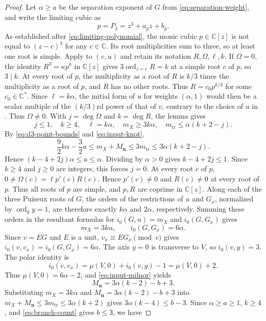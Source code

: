 \documentclass[11pt,letterpaper]{article}
\numberwithin{equation}{section}
\theoremstyle{remark}
\theoremstyle{plain}
\newcommand{\C}{\mathbb{C}}
\newcommand{\ord}{\operatorname{ord}}
\begin{document}
\begin{proof}
Let $\alpha\geq a$ be the separation exponent of $G$ from
\eqref{eq:separation-weight}, and write the limiting cubic as
\[
 p=P_3=z^3+a_pz+b_p.
\]
As established after \eqref{eq:limiting-polynomial}, the monic cubic
$p\in\C[z]$ is not equal to $(z-c)^3$ for any
$c\in\C$.  Its root multiplicities sum to three, so at least one
root is simple.
Apply  to $(v,u)$ and retain its notation
$R,\Omega,\ell,k$.
If $\Omega=0$, the identity $R^3=\kappa p^k$ in $\C[z]$
gives $3\ord_{z=c}R=k$ at a simple root $c$ of $p$, so $3\mid k$.
At every root of $p$, the multiplicity as a root of $R$ is
$k/3$ times the multiplicity as a root of $p$, and $R$ has no other roots.
Thus $R=c_0p^{k/3}$ for some $c_0\in\C^*$.
Since $\ell=k\alpha$, the initial form of $u$ for weights $(\alpha,1)$ would then be a
scalar multiple of the $(k/3)$rd power of that of $v$, contrary
to the choice of $u$ in .
Thus $\Omega\neq0$.  With $j=\deg\Omega$ and $k=\deg R$, the lemma gives
\[
 j\leq1,\quad k\geq4,\quad \ell=k\alpha,\quad
 m_X\geq3k\alpha,\quad
 m_{\mathrm{tr}}\leq\alpha(k+2-j).
\]
By \eqref{eq:d3-point-bounds} and \eqref{eq:input-knot},
\[
 \frac92k\alpha-\frac32a
 \leq m_X+M_{\boldsymbol n}\leq3m_{\mathrm{tr}}
 \leq3\alpha(k+2-j).
\]
Hence $(k-4+2j)\alpha\leq a\leq\alpha$.
Dividing by $\alpha>0$ gives $k-4+2j\leq1$.
Since $k\geq4$ and $j\geq0$ are integers, this forces
$j=0$.  At every root $c$ of $p$,
$0\neq\Omega(c)=\ell p'(c)R(c)$.
Hence $p'(c)\neq0$ and $R(c)\neq0$ at every root of $p$.
Thus all roots of $p$ are simple, and $p,R$ are coprime in
$\C[z]$.  Along each of the three Puiseux roots of $G$,
the orders of the restrictions of $u$ and $G_x$, normalized by
$\ord_y y=1$, are therefore exactly $k\alpha$ and $2\alpha$,
respectively.  Summing these orders in the
resultant formulas for $i_0(G,u)=m_X$ and $i_0(G,G_x)$ gives
\[
 m_X=3k\alpha,\qquad i_0(G,G_x)=6\alpha.
\]
Since $v=EG$ and $E$ is a unit, $v_x\equiv EG_x\pmod v$
gives $i_0(v,v_x)=i_0(G,G_x)=6\alpha$.
The axis $y=0$ is transverse to $V$, so $i_0(v,y)=3$.
The polar identity
\cite[Lemma~7.2.1 and its consequence, pp.~160--161]{Wall} is
\[
 i_0(v,v_x)=\mu(V,0)+i_0(v,y)-1=\mu(V,0)+2.
\]
Thus $\mu(V,0)=6\alpha-2$, and \eqref{eq:input-milnor} yields
\[
 M_{\boldsymbol n}=3\alpha(k-2)-b+3.
\]
Substituting $m_X=3k\alpha$ and
$M_{\boldsymbol n}=3\alpha(k-2)-b+3$ into
$m_X+M_{\boldsymbol n}\leq3m_{\mathrm{tr}}\leq3\alpha(k+2)$
gives $3\alpha(k-4)\leq b-3$.
Since $\alpha\geq a\geq1$, $k\geq4$, and
\eqref{eq:branch-count} gives $b\leq3$, we have

\end{proof}
\end{document}
